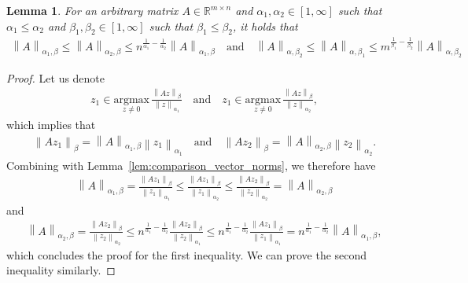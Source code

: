 \documentclass[10pt,a4paper]{amsart}
\newtheorem{lemma}{Lemma}
\newcommand{\Norm}[1]{\left\|#1\right\|}
\newcommand{\RR}{\mathbb{R}}
\newcommand{\argmax}[1]{\underset{ #1 }{\mathrm{argmax}}\, }
\begin{document}
\begin{lemma}\label{lem:comparing_matrix_norms}
    For an arbitrary matrix $A \in \RR^{m\times n}$ and $\alpha_1,\alpha_2 \in [1,\infty]$ such that $\alpha_1 \le \alpha_2$ and $\beta_1,\beta_2 \in [1,\infty]$ such that $\beta_1 \le \beta_2$, it holds that
    \begin{align*}
        \Norm{A}_{\alpha_1,\beta} \le \Norm{A}_{\alpha_2,\beta} \le n^{\frac{1}{\alpha_1} - \frac{1}{\alpha_2}} \Norm{A}_{\alpha_1,\beta} 
        \quad \mathrm{and} \quad
        \Norm{A}_{\alpha,\beta_2} \le \Norm{A}_{\alpha,\beta_1} \le m^{\frac{1}{\beta_1} - \frac{1}{\beta_2}} \Norm{A}_{\alpha,\beta_2} 
    \end{align*}
\end{lemma}

\begin{proof}
    Let us denote 
    \begin{align*}
        z_1 \in \argmax{z\neq 0} \frac{\Norm{A z}_\beta}{\Norm{z}_{\alpha_1}} \quad \mathrm{and} \quad z_1 \in \argmax{z\neq 0} \frac{\Norm{A z}_\beta}{\Norm{z}_{\alpha_2}} ,
    \end{align*}
    which implies that
    \begin{align*}
        \Norm{A z_1}_\beta = \Norm{A}_{\alpha_1, \beta} \Norm{z_1}_{\alpha_1} \quad \mathrm{and} \quad \Norm{A z_2}_\beta = \Norm{A}_{\alpha_2, \beta} \Norm{z_2}_{\alpha_2} .
    \end{align*}
    Combining with Lemma~\ref{lem:comparison_vector_norms}, we therefore have
    \begin{align*}
        \Norm{A}_{\alpha_1, \beta} = \frac{\Norm{A z_1}_\beta}{\Norm{z_1}_{\alpha_1}} \le \frac{\Norm{A z_1}_\beta}{\Norm{z_1}_{\alpha_2}} \le \frac{\Norm{A z_2}_\beta}{\Norm{z_2}_{\alpha_2}} = \Norm{A}_{\alpha_2, \beta} 
    \end{align*}
    and
    \begin{align*}
        \Norm{A}_{\alpha_2, \beta} = \frac{\Norm{A z_2}_\beta}{\Norm{z_2}_{\alpha_2}} \le n^{\frac{1}{\alpha_1} - \frac{1}{\alpha_2}} \frac{\Norm{A z_2}_\beta}{\Norm{z_2}_{\alpha_1}} \le n^{\frac{1}{\alpha_1} - \frac{1}{\alpha_2}} \frac{\Norm{A z_1}_\beta}{\Norm{z_1}_{\alpha_1}} = n^{\frac{1}{\alpha_1} - \frac{1}{\alpha_2}} \Norm{A}_{\alpha_1, \beta} ,
    \end{align*}
    which concludes the proof for the first inequality. We can prove the second inequality similarly.
\end{proof}
\end{document}
